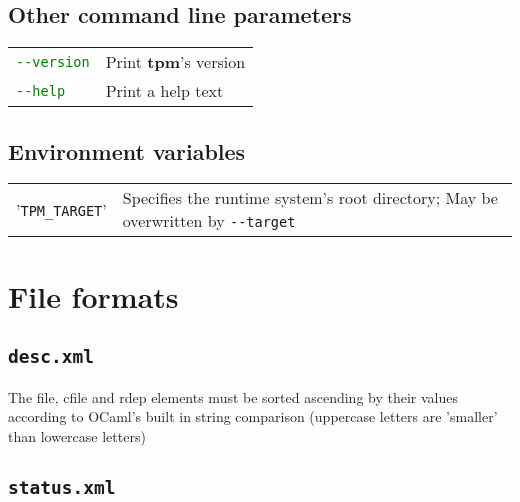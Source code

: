 \documentclass[a4paper]{article}
\newcommand{\file}[1]{\texttt{#1}}
\newcommand{\program}[1]{\textbf{#1}}
\newcommand{\variable}[1]{'\texttt{#1}'}
\newcommand{\green}[1]{\textcolor{green}{#1}}
\begin{document}
	\subsection{Other command line parameters}
	\label{sec:other_command_line_parameters}
	
	\bgroup
	\def\arraystretch{1.5}
	\begin{tabularx}{\textwidth}{lX}
		\green{\texttt{-{}-version}} & Print \program{tpm}'s version \\
		\green{\texttt{-{}-help}} & Print a help text
	\end{tabularx}
	\egroup
	
	\subsection{Environment variables}
	\label{sec:environment_variables}
	
	\bgroup
	\def\arraystretch{1.5}
	\begin{tabularx}{\textwidth}{lX}
		\variable{TPM\_TARGET} & Specifies the runtime system's root directory; May be overwritten by \texttt{-{}-target} \\
	\end{tabularx}
	\egroup
	
	\section{File formats}
	\label{sec:file_formats}
	
	\subsection{\file{desc.xml}}
	\label{sec:desc.xml}
	

	\vspace{1em}
	The file, cfile and rdep elements must be sorted ascending by their values according to OCaml's built in string comparison (uppercase letters are 'smaller' than lowercase letters)
	
	\subsection{\file{status.xml}}
	\label{sec:status.xml}
	
\end{document}
